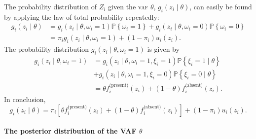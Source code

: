 \documentclass[12pt,a4paper]{article}
\numberwithin{equation}{section}
\newcommand{\p}[1]{\mathds{P}\left\{#1\right\}}
\begin{document}
The probability distribution of $Z_i$ given the \textsc{vaf} $\theta$, $g_i(z_i \mid \theta)$, can easily be found by applying the law of total probability repeatedly: 
\begin{equation}
	\begin{aligned}
		g_i (z_i \mid \theta) & =  g_i (z_i \mid \theta, \omega_i = 1) \p{\omega_i = 1} + g_i (z_i \mid \theta, \omega_i = 0) \p{\omega_i = 0} \\
					& = \pi_i g_i (z_i \mid \theta, \omega_i = 1) + \left(1 - \pi_i \right) u_i (z_i).
	\end{aligned}
\end{equation}
The probability distribution $g_i (z_i \mid \theta, \omega_i = 1)$ is given by
\begin{equation}
	\begin{aligned}
		g_i (z_i \mid \theta, \omega_i = 1) 	& = g_i (z_i \mid \theta, \omega_i = 1, \xi_i = 1) \p{\xi_i = 1 \mid \theta} \\ 
							& +  g_i (z_i \mid \theta, \omega_i = 1, \xi_i = 0) \p{\xi_i = 0 \mid \theta} \\
							& = \theta f_i^{\text{(present)}}(z_i) + (1 - \theta) f_i^{\text{(absent)}}(z_i).
	\end{aligned}
\end{equation}
In conclusion, 
\begin{equation}
	g_i (z_i \mid \theta) = \pi_i \left[\theta f_i^{\text{(present)}}(z_i) + \left(1 - \theta \right) f_i^{\text{(absent)}}(z_i) \right] + \left(1 - \pi_i \right) u_i(z_i). 
\end{equation}


\paragraph{The posterior distribution of the VAF $\theta$}
\end{document}
